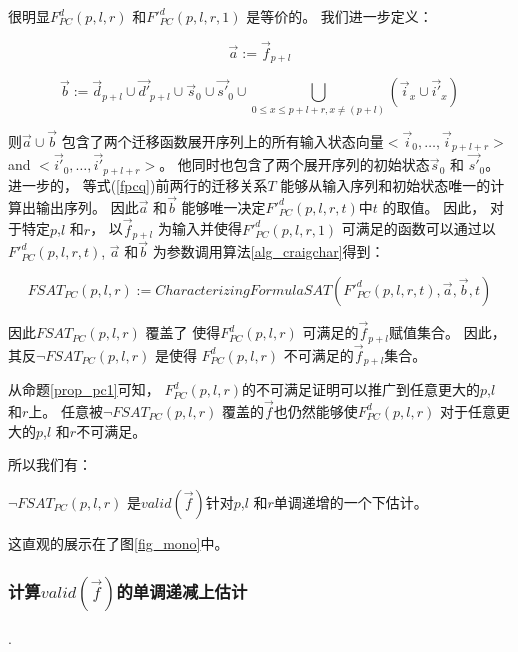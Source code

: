 很明显$F^d_{PC}(p,l,r)$ 和$F'^d_{PC}(p,l,r,1)$ 是等价的。
我们进一步定义：

\begin{equation}\label{pcdef1}
\vec{a}:=\vec{f}_{p+l}
\end{equation}

\begin{equation}\label{pcdef2}
\vec{b}:=\vec{d}_{p+l}\cup \vec{d'}_{p+l}\cup \vec{s}_0\cup \vec{s'}_0\cup\bigcup_{0\le x\le p+l+r,x\neq (p+l)}(\vec{i}_{x}\cup\vec{i'}_{x})
\end{equation}

则$\vec{a}\cup\vec{b}$ 包含了两个迁移函数展开序列上的所有输入状态向量$<\vec{i}_0,\dots,\vec{i}_{p+l+r}>$ and $<\vec{i'}_0,\dots,\vec{i'}_{p+l+r}>$。
他同时也包含了两个展开序列的初始状态$\vec{s}_0$ 和 $\vec{s'}_0$。
进一步的，
等式(\ref{fpcq})前两行的迁移关系$T$
能够从输入序列和初始状态唯一的计算出输出序列。
因此$\vec{a}$ 和$\vec{b}$ 能够唯一决定$F'^d_{PC}(p,l,r,t)$中$t$ 的取值。
因此，
对于特定$p$,$l$ 和$r$，
以$\vec{f}_{p+l}$ 为输入并使得$F'^d_{PC}(p,l,r,1)$ 可满足的函数可以通过以$F'^d_{PC}(p,l,r,t)$, $\vec{a}$ 和$\vec{b}$ 为参数调用算法\ref{alg_craigchar}得到：

\begin{equation}\label{fsat_pc}
FSAT_{PC}(p,l,r):=CharacterizingFormulaSAT(F'^d_{PC}(p,l,r,t),\vec{a},\vec{b},t)
\end{equation}

因此$FSAT_{PC}(p,l,r)$ 覆盖了
使得$F^d_{PC}(p,l,r)$ 可满足的$\vec{f}_{p+l}$赋值集合。
因此，
其反$\neg FSAT_{PC}(p,l,r)$ 是使得
$F^d_{PC}(p,l,r)$ 不可满足的$\vec{f}_{p+l}$集合。

从命题\ref{prop_pc1}可知，
$F^d_{PC}(p,l,r)$的不可满足证明可以推广到任意更大的$p$,$l$ 和$r$上。
任意被$\neg FSAT_{PC}(p,l,r)$ 覆盖的$\vec{f}$也仍然能够使$F^d_{PC}(p,l,r)$ 对于任意更大的$p$,$l$ 和$r$不可满足。

所以我们有：

\begin{proposition}\label{prop_pc}
$\neg FSAT_{PC}(p,l,r)$ 是$valid(\vec{f})$针对$p$,$l$ 和$r$单调递增的一个下估计。
\end{proposition}


这直观的展示在了图\ref{fig_mono}中。

\subsubsection{\textbf{计算$valid(\vec{f})$的单调递减上估计}}\label{subsub_loop}.

